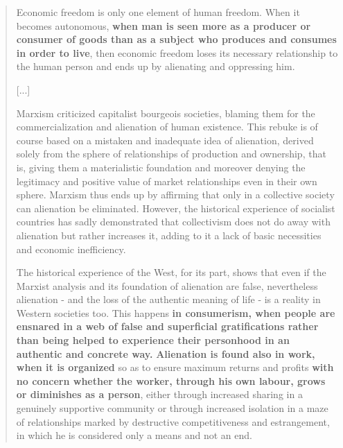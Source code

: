 \documentclass[letterpaper]{article}
\begin{document}
\begin{quote}
  Economic freedom is only one element of human freedom. When it becomes autonomous, \textbf{when man is seen more as a producer or consumer of goods than as a subject who produces and consumes in order to live}, then economic freedom loses its necessary relationship to the human person and ends up by alienating and oppressing him.

  [...]

  Marxism criticized capitalist bourgeois societies, blaming them for the commercialization and alienation of human existence. This rebuke is of course based on a mistaken and inadequate idea of alienation, derived solely from the sphere of relationships of production and ownership, that is, giving them a materialistic foundation and moreover denying the legitimacy and positive value of market relationships even in their own sphere. Marxism thus ends up by affirming that only in a collective society can alienation be eliminated. However, the historical experience of socialist countries has sadly demonstrated that collectivism does not do away with alienation but rather increases it, adding to it a lack of basic necessities and economic inefficiency.

  The historical experience of the West, for its part, shows that even if the Marxist analysis and its foundation of alienation are false, nevertheless alienation - and the loss of the authentic meaning of life - is a reality in Western societies too. This happens \textbf{in consumerism, when people are ensnared in a web of false and superficial gratifications rather than being helped to experience their personhood in an authentic and concrete way.} \textbf{Alienation is found also in work, when it is organized} so as to ensure maximum returns and profits \textbf{with no concern whether the worker, through his own labour, grows or diminishes as a person}, either through increased sharing in a genuinely supportive community or through increased isolation in a maze of relationships marked by destructive competitiveness and estrangement, in which he is considered only a means and not an end.


\end{quote}
\end{document}
